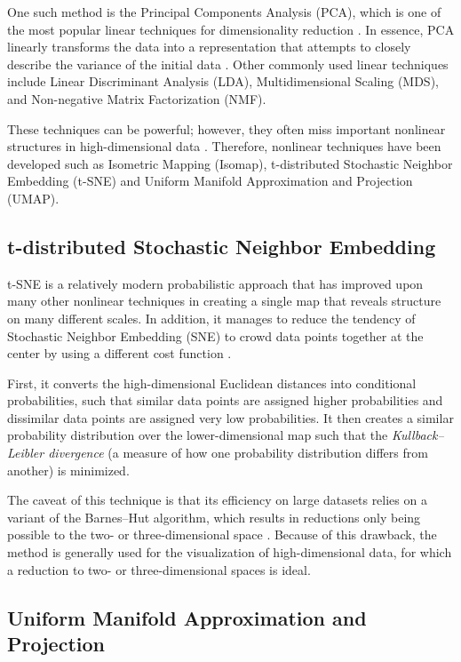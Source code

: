 \documentclass[english,bachelor,ul]{webisthesis} %
\begin{document}
One such method is the Principal Components Analysis (PCA), which is one of the most popular linear techniques for dimensionality reduction \citep{van2009dimensionality}. In essence, PCA linearly transforms the data into a representation that attempts to closely describe the variance of the initial data \citep{jolliffe2016principal}. Other commonly used linear techniques include Linear Discriminant Analysis (LDA), Multidimensional Scaling (MDS), and Non-negative Matrix Factorization (NMF).

These techniques can be powerful; however, they often miss important nonlinear structures in high-dimensional data \citep{Tenenbaum2000AGG}. Therefore, nonlinear techniques have been developed such as Isometric Mapping (Isomap), t-distributed Stochastic Neighbor Embedding (t-SNE) and Uniform Manifold Approximation and Projection (UMAP). 

\subsection*{t-distributed Stochastic Neighbor Embedding}

t-SNE is a relatively modern probabilistic approach that has improved upon many other nonlinear techniques in creating a single map that reveals structure on many different scales. In addition, it manages to reduce the tendency of Stochastic Neighbor Embedding (SNE) to crowd data points together at the center by using a different cost function \citep{van2008visualizing}. 

First, it converts the high-dimensional Euclidean distances into conditional probabilities, such that similar data points are assigned higher probabilities and dissimilar data points are assigned very low probabilities. It then creates a similar probability distribution over the lower-dimensional map such that the \textit{Kullback--Leibler divergence} (a measure of how one probability distribution differs from another) is minimized. 

The caveat of this technique is that its efficiency on large datasets relies on a variant of the Barnes--Hut algorithm, which results in reductions only being possible to the two- or three-dimensional space \citep{DBLP:journals/corr/abs-1301-3342}. Because of this drawback, the method is generally used for the visualization of high-dimensional data, for which a reduction to two- or three-dimensional spaces is ideal.

\subsection*{Uniform Manifold Approximation and Projection}
\end{document}

